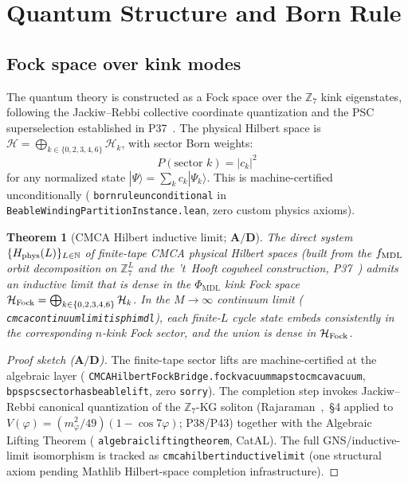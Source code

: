 \documentclass[11pt]{article}
\newtheorem{theorem}{Theorem}[section]
\theoremstyle{remark}
\newcommand{\PHIMDL}{\Phi_{\mathrm{MDL}}}
\newcommand{\ZS}{\mathbb{Z}_7}
\newcommand{\lean}[1]{%
  \penalty-100
  \begingroup\def\_{\textunderscore\allowbreak}\texttt{#1}\endgroup}
\newcommand{\CatAD}{\textbf{A/D}}
\begin{document}
\section{Quantum Structure and Born Rule}
\label{sec:quantum}

\subsection{Fock space over kink modes}
\label{ssec:fock}

The quantum theory is constructed as a Fock space over the $\ZS$ kink
eigenstates, following the Jackiw--Rebbi collective coordinate quantization
and the PSC superselection established in P37~\cite{SpivackQMFromR110}.
The physical Hilbert space is $\mathcal{H}=\bigoplus_{k\in\{0,2,3,4,6\}}\mathcal{H}_k$,
with sector Born weights:
\begin{equation}
  P(\text{sector }k) = |c_k|^2
  \label{eq:sector_born}
\end{equation}
for any normalized state $|\Psi\rangle = \sum_{k}c_k|\Psi_k\rangle$.
This is machine-certified unconditionally (\lean{born\_rule\_unconditional}
in \lean{BeableWindingPartitionInstance.lean}, zero custom physics axioms).

\begin{theorem}[CMCA Hilbert inductive limit; $\CatAD$]
  \label{thm:cmca_hilbert_inductive_limit}
  The direct system $\{H_{\rm phys}(L)\}_{L\in\mathbb{N}}$ of finite-tape CMCA
  physical Hilbert spaces (built from the $f_{\rm MDL}$ orbit decomposition on
  $\mathbb{Z}_7^L$ and the 't~Hooft cogwheel construction, P37~\cite{SpivackQMFromR110})
  admits an inductive limit that is dense in the $\PHIMDL$ kink Fock space
  $\mathcal{H}_{\rm Fock}=\bigoplus_{k\in\{0,2,3,4,6\}}\mathcal{H}_k$.
  In the $M\to\infty$ continuum limit (\lean{cmca\_continuum\_limit\_is\_phimdl}),
  each finite-$L$ cycle state embeds consistently in the corresponding $n$-kink
  Fock sector, and the union is dense in $\mathcal{H}_{\rm Fock}$.
\end{theorem}
\begin{proof}[Proof sketch ($\CatAD$)]
  The finite-tape sector lifts are machine-certified at the algebraic layer
  (\lean{CMCAHilbertFockBridge.fock\_vacuum\_maps\_to\_cmca\_vacuum},
  \lean{bps\_psc\_sector\_has\_beable\_lift}, zero \texttt{sorry}).
  The completion step invokes Jackiw--Rebbi canonical quantization of the
  $\mathbb{Z}_7$-KG soliton (Rajaraman~\cite{Rajaraman1982},~\S4 applied to
  $V(\varphi)=(m_\varphi^2/49)(1-\cos 7\varphi)$; P38/P43) together with the
  Algebraic Lifting Theorem (\lean{algebraic\_lifting\_theorem}, CatAL).
  The full GNS/inductive-limit isomorphism is tracked as
  \lean{cmca\_hilbert\_inductive\_limit} (one structural axiom pending Mathlib
  Hilbert-space completion infrastructure).
\end{proof}
\end{document}
